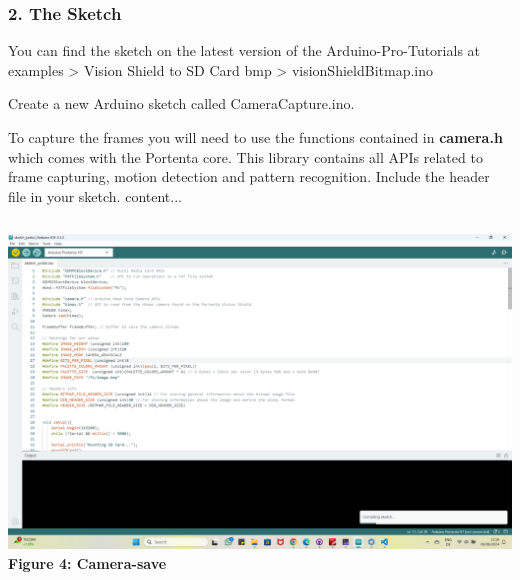 \documentclass[10pt, a4paper]{beamer}
\begin{document}
	\begin{frame}
		\frametitle{2. The Sketch}
			You can find the sketch on the latest version of the Arduino-Pro-Tutorials at
			examples > Vision Shield to SD Card bmp > visionShieldBitmap.ino
				\begin{block}{}
					Create a new Arduino sketch called CameraCapture.ino.\newline
					
					To capture the frames you will need to use the functions contained in \textbf{camera.h} which comes with the Portenta core. This library contains all APIs related to frame capturing, motion detection and pattern recognition. Include the header file in your sketch.
					content...
					
						\begin{columns}
							\centering
							\includegraphics[width=\textwidth]{images/Camera-save.png}
							\vspace{0.2cm}
							\textbf{Figure 4: Camera-save}
						\end{columns}
				\end{block}
			
	\end{frame}
	
\end{document}
